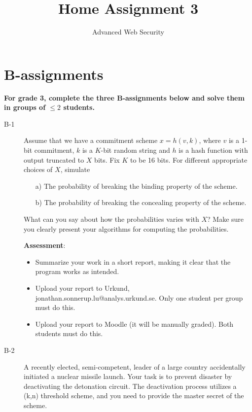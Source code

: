 \documentclass{article}
\begin{document}
	
\title{Home Assignment 3}
\author{Advanced Web Security}
\date{\the\year}

\maketitle

\section*{B-assignments}
\textbf{For grade 3, complete the three B-assignments below and solve them in groups of $\leq 2$ students.}

\begin{description}
	\item[B-1]{Assume that we have a commitment scheme $x = h(v, k)$, where $v$ is a 1-bit commitment,
		$k$ is a $K$-bit random string and $h$ is a hash function with output truncated to $X$ bits.
		Fix $K$ to be 16 bits. For different appropriate choices of $X$, simulate
		\begin{itemize}
			\item[a)] The probability of breaking the binding property of the scheme.
			\item[b)] The probability of breaking the concealing property of the scheme.
		\end{itemize}
		What can you say about how the probabilities varies with $X$? Make sure you clearly present
		your algorithms for computing the probabilities.
		
		\textbf{Assessment}:
		\begin{itemize}
			\item Summarize your work in a short report, making it clear that the program works as intended.
			
			\item Upload your report to Urkund, jonathan.sonnerup.lu@analys.urkund.se. 
			Only one student per group must do this.
			
			\item Upload your report to Moodle (it will be manually graded). Both students must do this.
		\end{itemize}}
		
		
		\item[B-2]{A recently elected, semi-competent, leader of a large country accidentally initiated a nuclear missile launch. Your task is to prevent disaster by deactivating the detonation circuit. The deactivation process
			utilizes a (k,n) threshold scheme, and you need to provide the master secret of the scheme.
			
}
\end{description}
\end{document}
